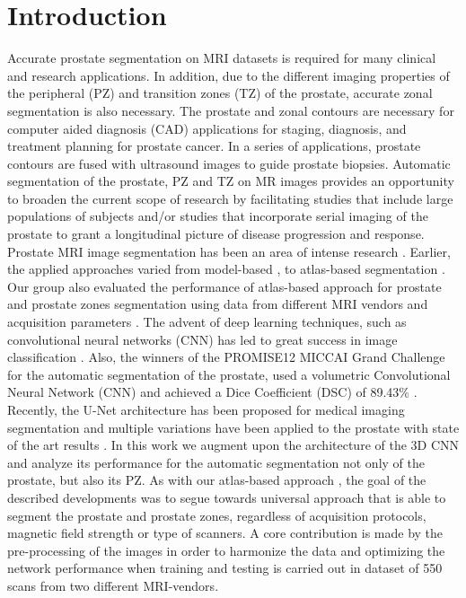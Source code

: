 \section{Introduction}
\label{sec:intro}
Accurate prostate segmentation on MRI datasets is required for many clinical and research applications. In addition, due to the different imaging properties of the peripheral (PZ) and transition zones (TZ) of the prostate, accurate zonal segmentation is also necessary.  The prostate and zonal contours are necessary for computer aided diagnosis (CAD) applications for staging, diagnosis, and treatment planning for prostate cancer. In a series of applications, prostate contours are fused with ultrasound images to guide prostate biopsies. Automatic segmentation of the prostate, PZ and TZ on MR images provides an opportunity to broaden the current scope of research by facilitating studies that include large populations of subjects and/or studies that incorporate serial imaging of the prostate to grant a longitudinal picture of disease progression and response.  Prostate MRI image segmentation has been an area of intense research \cite{litjens2014evaluation}. Earlier, the applied approaches varied from model-based \cite{chowdhury2012concurrent,toth2012multifeature}, to atlas-based segmentation \cite{4_klein2008automatic,5_cheng2014atlas,6_xie2014low,7_tian2015fully,8_korsager2015use,9_chilali2016gland}.  Our group also evaluated the performance of atlas-based approach for prostate and prostate zones segmentation using data from different MRI vendors and acquisition parameters \cite{10_padgett2018towards}. The advent of deep learning techniques, such as convolutional neural networks (CNN) has led to great success in image classification \cite{11_krizhevsky2012imagenet,12_simonyan2011immediate}.  Also, the winners of the PROMISE12 MICCAI Grand Challenge \cite{litjens2014evaluation} for the automatic segmentation of the prostate,  used a volumetric Convolutional Neural Network (CNN) and achieved a Dice Coefficient (DSC) of 89.43\% \cite{yu2017volumetric}.  Recently, the U-Net architecture has been proposed \cite{13_ronneberger2015u} for medical imaging segmentation and multiple variations have been applied to the prostate with state of the art results \cite{anneke}. In this work we augment upon the architecture of the 3D CNN and analyze its performance for the automatic segmentation not only of the  prostate, but also its PZ. As with our atlas-based approach \cite{10_padgett2018towards}, the goal of the described developments was to segue towards universal approach that is able to segment the prostate and prostate zones, regardless of acquisition protocols, magnetic field strength or type of scanners. A core contribution is made by the pre-processing of the images in order to harmonize the data and optimizing the network performance when training and testing is carried out in dataset of 550 scans  from two different MRI-vendors. 
